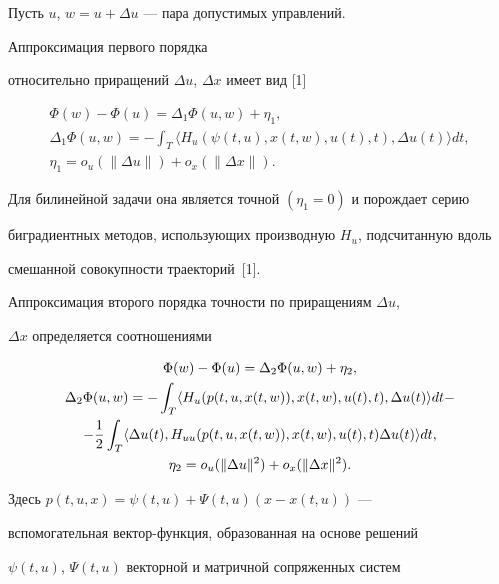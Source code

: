 Пусть $u$, $w=u+\Delta u$ --- пара допустимых управлений. 


Аппроксимация первого порядка


относительно приращений $\Delta u$, $\Delta x$ имеет вид [1]


\begin{gather*}


\Phi(w)-\Phi(u)=\Delta_1\Phi(u,w)+\eta_1,\\


\Delta_1\Phi(u,w)=


-\int_T\langle H_u(\psi(t,u),x(t,w),u(t),t),\Delta u(t)\rangle dt,\\


\eta_1=o_u(\|\Delta u\|)+o_x(\|\Delta x\|).


\end{gather*}


Для билинейной задачи она является точной $(\eta_1=0)$ и порождает серию 


биградиентных методов, использующих производную $H_u$, подсчитанную вдоль


смешанной совокупности траекторий~[1].





Аппроксимация второго порядка точности по приращениям $\Delta u$, 


$\Delta x$ определяется соотношениями


\begin{gather}


\Phi(w)-\Phi(u)=\Delta_2\Phi(u,w)+\eta_2, \\


\Delta_2\Phi(u,w)=-\int_T


\langle H_u(p(t,u,x(t,w)),x(t,w),u(t),t),\Delta u(t)\rangle dt-\notag \\


-\frac{1}{2}\int_T\langle\Delta u(t),H_{uu}(p(t,u,x(t,w)),x(t,w),u(t),t)


\Delta u(t)\rangle dt,\notag\\


\eta_2=o_u(\|\Delta u\|^2)+o_x(\|\Delta x\|^2).\notag


\end{gather}


Здесь $p(t,u,x)=\psi(t,u)+\Psi(t,u)(x-x(t,u))$ --- 


вспомогательная вектор-функция, образованная на основе решений 


$\psi(t,u)$, $\Psi(t,u)$ векторной и матричной сопряженных систем


